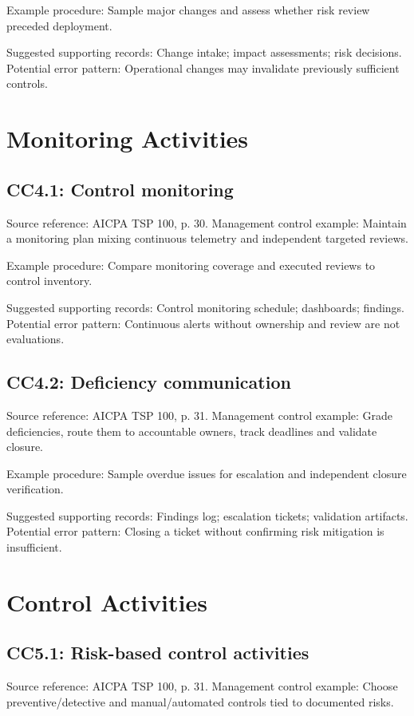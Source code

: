 \documentclass[10pt,oneside]{report}
\begin{document}
Example procedure: Sample major changes and assess whether risk review preceded deployment.

Suggested supporting records: Change intake; impact assessments; risk decisions. Potential error pattern: Operational changes may invalidate previously sufficient controls.

\section{Monitoring Activities}
\subsection*{CC4.1: Control monitoring}
Source reference: AICPA TSP 100, p. 30. Management control example: Maintain a monitoring plan mixing continuous telemetry and independent targeted reviews.

Example procedure: Compare monitoring coverage and executed reviews to control inventory.

Suggested supporting records: Control monitoring schedule; dashboards; findings. Potential error pattern: Continuous alerts without ownership and review are not evaluations.

\subsection*{CC4.2: Deficiency communication}
Source reference: AICPA TSP 100, p. 31. Management control example: Grade deficiencies, route them to accountable owners, track deadlines and validate closure.

Example procedure: Sample overdue issues for escalation and independent closure verification.

Suggested supporting records: Findings log; escalation tickets; validation artifacts. Potential error pattern: Closing a ticket without confirming risk mitigation is insufficient.

\section{Control Activities}
\subsection*{CC5.1: Risk-based control activities}
Source reference: AICPA TSP 100, p. 31. Management control example: Choose preventive/detective and manual/automated controls tied to documented risks.
\end{document}
